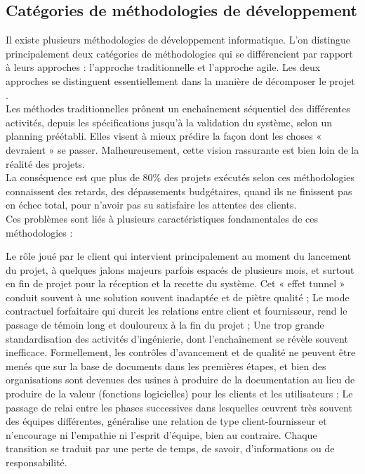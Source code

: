 \subsection{Catégories de méthodologies de développement}
Il existe plusieurs méthodologies de développement informatique. L’on distingue principalement
deux catégories de méthodologies qui se différencient par rapport à leurs approches : l’approche traditionnelle et l’approche agile. Les deux approches se distinguent essentiellement dans la manière de décomposer le projet \cite{agvsvl}.\\
Les méthodes traditionnelles prônent un enchaînement séquentiel des différentes activités, depuis les spécifications jusqu'à la validation du système, selon un planning préétabli. Elles visent à mieux prédire la façon dont les choses « devraient » se passer. Malheureusement, cette vision rassurante est bien loin de la réalité des projets.\\
La conséquence est que plus de 80\% des projets exécutés selon ces méthodologies connaissent des retards, des dépassements budgétaires, quand ils ne finissent pas en échec total, pour n’avoir pas su satisfaire les attentes des clients.\\
Ces problèmes sont liés à plusieurs caractéristiques fondamentales de ces méthodologies :
\begin{itemize}
	\itemtirait Le rôle joué par le client qui intervient principalement au moment du lancement du projet, à quelques jalons majeurs parfois espacés de plusieurs mois, et surtout en fin de projet pour la réception et la recette du système. Cet « effet tunnel » conduit souvent à une solution souvent inadaptée et de piètre qualité ;
	\itemtirait Le mode contractuel forfaitaire qui durcit les relations entre client et fournisseur, rend le passage de témoin long et douloureux à la fin du projet ;
	\itemtirait Une trop grande standardisation des activités d’ingénierie, dont l’enchaînement se révèle souvent inefficace. Formellement, les contrôles d'avancement et de qualité ne peuvent être menés que sur la base de documents dans les premières étapes, et bien des organisations sont devenues des usines à produire de la documentation au lieu de produire de la valeur (fonctions logicielles) pour les clients et les utilisateurs ;
	\itemtirait Le passage de relai entre les phases successives dans lesquelles œuvrent très souvent des équipes différentes, généralise une relation de type client-fournisseur et n’encourage ni l’empathie ni l’esprit d’équipe, bien au contraire. Chaque transition se traduit par une perte de temps, de savoir, d’informations ou de responsabilité.
\end{itemize}

